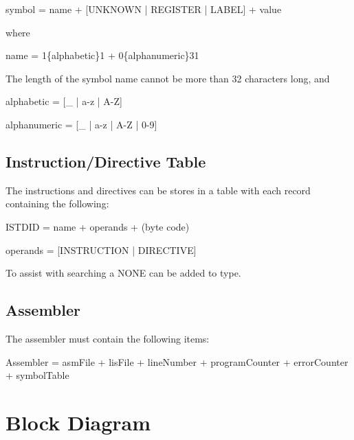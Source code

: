 \documentclass[titlepage, 12pt]{article}
\begin{document}
symbol = name + [UNKNOWN | REGISTER | LABEL] + value

where

name = 1\{alphabetic\}1 + 0\{alphanumeric\}31

The length of the symbol name cannot be more than 32 characters long, and

alphabetic = [\_ | a-z | A-Z]

alphanumeric = [\_ | a-z | A-Z | 0-9]

\subsection{Instruction/Directive Table}
The instructions and directives can be stores in a table with each record containing the following:

ISTDID = name + operands + (byte code)

operands = [INSTRUCTION | DIRECTIVE]

To assist with searching a NONE can be added to type.

\subsection{Assembler}
The assembler must contain the following items:

Assembler = asmFile + lisFile + lineNumber + programCounter + errorCounter + symbolTable

\section{Block Diagram}
\end{document}
